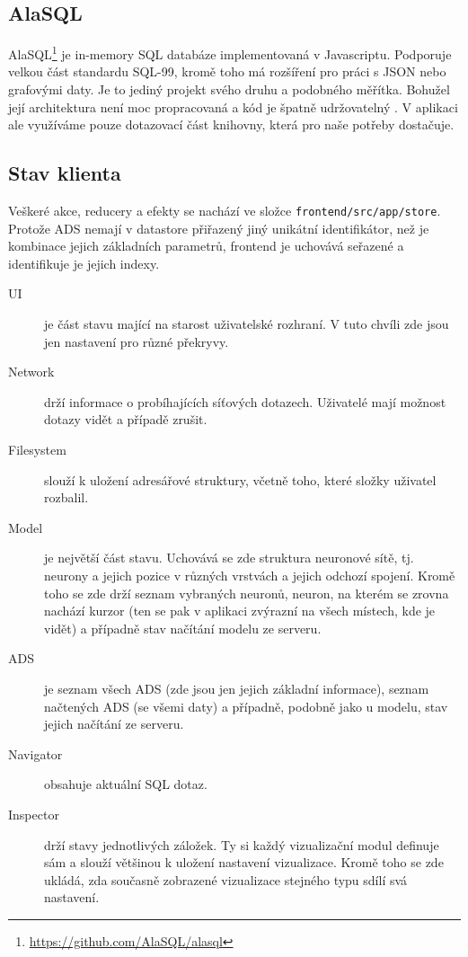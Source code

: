 \subsection{AlaSQL}

AlaSQL\footnote{\url{https://github.com/AlaSQL/alasql}} je in-memory SQL databáze implementovaná v Javascriptu. Podporuje velkou část standardu SQL-99, kromě toho má rozšíření pro práci s JSON nebo grafovými daty. Je to jediný projekt svého druhu a podobného měřítka. Bohužel její architektura není moc propracovaná a kód je špatně udržovatelný \cite{AlaSQLIssue}. V aplikaci ale využíváme pouze dotazovací část knihovny, která pro naše potřeby dostačuje.

\subsection{Stav klienta}

Veškeré akce, reducery a efekty se nachází ve složce \lstinline|frontend/src/app/store|. Protože ADS nemají v datastore přiřazený jiný unikátní identifikátor, než je kombinace jejich základních parametrů, frontend je uchovává seřazené a identifikuje je jejich indexy.

\begin{description}
  \item[UI] je část stavu mající na starost uživatelské rozhraní. V tuto chvíli zde jsou jen nastavení pro různé překryvy.
  \item[Network] drží informace o probíhajících síťových dotazech. Uživatelé mají možnost dotazy vidět a případě zrušit.
  \item[Filesystem] slouží k uložení adresářové struktury, včetně toho, které složky uživatel rozbalil.
  \item[Model] je největší část stavu. Uchovává se zde struktura neuronové sítě, tj. neurony a jejich pozice v různých vrstvách a jejich odchozí spojení. Kromě toho se zde drží seznam vybraných neuronů, neuron, na kterém se zrovna nachází kurzor (ten se pak v aplikaci zvýrazní na všech místech, kde je vidět) a případně stav načítání modelu ze serveru.
  \item[ADS] je seznam všech ADS (zde jsou jen jejich základní informace), seznam načtených ADS (se všemi daty) a případně, podobně jako u modelu, stav jejich načítání ze serveru.
  \item[Navigator] obsahuje aktuální SQL dotaz.
  \item[Inspector] drží stavy jednotlivých záložek. Ty si každý vizualizační modul definuje sám a slouží většinou k uložení nastavení vizualizace. Kromě toho se zde ukládá, zda současně zobrazené vizualizace stejného typu sdílí svá nastavení.
\end{description}

